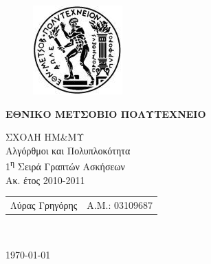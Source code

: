 \begin{titlepage}
\begin{center}
\begin{figure}[t] 
     \includegraphics[scale=0.7]{title/ntua_logo}
\end{figure}
\begin{LARGE}\textbf{ΕΘΝΙΚΟ ΜΕΤΣΟΒΙΟ ΠΟΛΥΤΕΧΝΕΙΟ\\}\end{LARGE}
\vspace{5cm}
\begin{Large}
ΣΧΟΛΗ ΗΜ\&ΜΥ\\
Αλγόρθμοι και Πολυπλοκότητα\\
1\textsuperscript{η} Σειρά Γραπτών Ασκήσεων\\
Ακ. έτος 2010-2011\\
\end{Large}
\vspace{10cm}
\begin{tabular}{l r}
\Large{Λύρας Γρηγόρης}&
\large{Α.Μ.: 03109687}\\
\end{tabular}\\
\vspace{1cm}

\vfill
\large\today\\
\end{center}
\end{titlepage}

